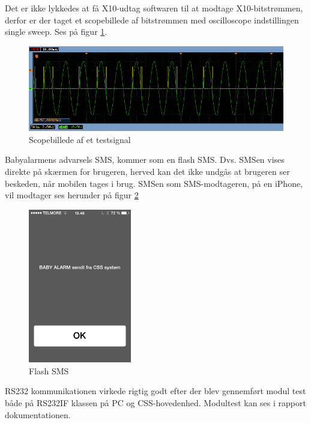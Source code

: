 Det er ikke lykkedes at få X10-udtag softwaren til at modtage X10-bitstrømmen, derfor er der taget et scopebillede af bitstrømmen med oscilloscope indstillingen single sweep. Ses på figur \ref{fig:Scop_test}.

\begin{figure}[htbp]
  \centering
    \includegraphics[width=\textwidth]{billeder/Modtager_0101_ON}
    \caption{Scopebillede af et testsignal}
    \label{fig:Scop_test}
\end{figure}

 
 
Babyalarmens advarsels SMS, kommer som en flash SMS. Dvs. SMSen vises direkte på skærmen for brugeren, herved kan det ikke undgås at brugeren ser beskeden, når mobilen tages i brug. SMSen som SMS-modtageren, på en iPhone, vil modtager ses herunder på figur \ref{fig:flashSMS}
 
\begin{figure}[htbp]
  \centering
    \includegraphics[width=0.4\textwidth]{billeder/flashSMS}
    \caption{Flash SMS}
    \label{fig:flashSMS}
\end{figure}
 
RS232 kommunikationen virkede rigtig godt efter der blev gennemført modul test både på RS232IF klassen på PC og CSS-hovedenhed. Modultest kan ses i rapport dokumentationen.

